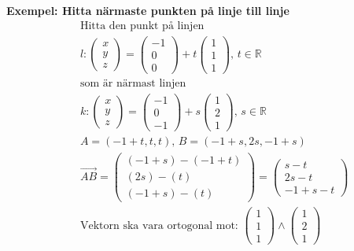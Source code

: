 \textbf{Exempel: Hitta närmaste punkten på linje till linje} %
\begin{align*}
  &\quad  \text{Hitta den punkt på linjen } \\
  &\quad  
  l: \begin{pmatrix} x \\ y \\ z \end{pmatrix} = \begin{pmatrix} -1 \\ 0 \\ 0 \end{pmatrix} +
  t\begin{pmatrix} 1 \\ 1 \\ 1 \end{pmatrix}, \, t\in\mathbb{R} \\
  &\quad  \text{som är närmast linjen } \\
  &\quad
  k: \begin{pmatrix} x \\ y \\ z \end{pmatrix} = \begin{pmatrix} -1 \\ 0 \\ -1 \end{pmatrix} +
  s\begin{pmatrix} 1 \\ 2 \\ 1 \end{pmatrix}, \, s\in\mathbb{R} \\
  &\quad  A=(-1+t,t,t), \, B=(-1+s,2s,-1+s) \\
  &\quad  \overrightarrow{AB}=
  \begin{pmatrix} (-1+s)-(-1+t) \\ (2s)-(t) \\ (-1+s)-(t) \end{pmatrix} =
  \begin{pmatrix} s-t \\ 2s-t \\ -1+s-t \end{pmatrix} \\
  &\quad  \text{Vektorn ska vara ortogonal mot: }
  \begin{pmatrix} 1 \\ 1 \\ 1 \end{pmatrix} \land
  \begin{pmatrix} 1 \\ 2 \\ 1 \end{pmatrix} \\

\end{align*}
